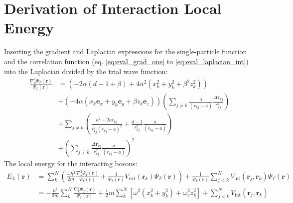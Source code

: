 \documentclass[12pt,a4paper,english]{article}
\begin{document}
\section{Derivation of Interaction Local Energy}
\label{appendix:local_E}
Inserting the gradient and Laplacian expressions for the single-particle function and the correlation function (eq. \ref{eq:eval_grad_one} to \ref{eq:eval_laplacian_int}) into the Laplacian divided by the trial wave function:
\begin{align}
\label{eq:H_int_deriv}
\frac{\nabla_k^2\Psi_T(\textbf{r})}{\Psi_T(\textbf{r})}&= \left(-2\alpha(d-1+\beta)+4\alpha^2(x_k^2+y_k^2+\beta^2z_k^2)\right)\nonumber\\
&+\left(-4\alpha(x_k\textbf{e}_x+y_k\textbf{e}_y+\beta z_k\textbf{e}_z)\right)\left(\sum_{j\neq k}\frac{a}{(r_{kj}-a)}\frac{\Delta\textbf{r}_{kj}}{r_{kj}^2}\right)\nonumber\\
&+\sum_{j\neq k}\left(\frac{a^2-2ar_{kj}}{r_{kj}^2(r_{kj}-a)^2}+\frac{d-1}{r_{kj}^2}\frac{a}{(r_{kj}-a)}\right)\nonumber\\
&+\left(\sum_{j\neq k}\frac{\Delta \textbf{r}_{kj}}{r_{kj}^2}\frac{a}{(r_{kj}-a)}\right)^2
\end{align}
The local energy for the interacting bosons:
\begin{align}
\label{eq:local_E_deriv}
E_L(\textbf{r})&=\sum_k^N\left(\frac{-\hbar^2}{2m}\frac{\nabla_k^2\Psi_T(\textbf{r})}{\Psi_T(\textbf{r})}+\frac{1}{\Psi_T(\mathbf{r})}V_{\text{ext}}(\textbf{r}_k)\Psi_T(\mathbf{r})\right)+\frac{1}{\Psi_T(\mathbf{r})}\sum_{j<k}^{N}V_{\text{int}}(\textbf{r}_j,\textbf{r}_k)\Psi_T(\mathbf{r})\nonumber\\
&=-\frac{\hbar^2}{2m}\sum_k^N\frac{\nabla_k^2\Psi_T(\textbf{r})}{\Psi_T(\textbf{r})}
+\frac{1}{2}m\sum_k^N[\omega^2(x_k^2+y_k^2) + \omega_z^2z_k^2]
+\sum_{j<k}^{N}V_{\text{int}}(\textbf{r}_j,\textbf{r}_k)
\end{align}



\end{document}
